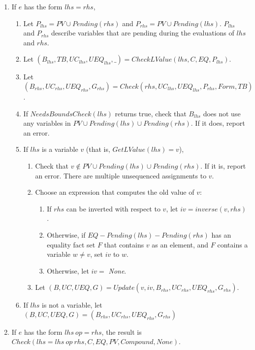 \begin{enumerate}
\item If $e$ has the form $lhs = rhs$,
\label{list:check-assignment}
\begin{enumerate}
\item Let $P_{lhs} = PV \cup Pending(rhs)$ and $P_{rhs} = PV \cup Pending(lhs).$   $P_{lhs}$
        and $P_{rhs}$ describe variables that are pending during the evaluations of $lhs$ and $rhs$.
\item Let $(B_{lhs}, TB, {UC}_{lhs}, {UEQ}_{lhs}, \_) = CheckLValue(lhs, C, EQ, P_{lhs})$.  
\item Let $(B_{rhs},  {UC}_{rhs}, {UEQ}_{rhs}, G_{rhs}) = 
Check(rhs, {UC}_{lhs}, {UEQ}_{lhs},P_{rhs}, Form, TB)$.
\item If $NeedsBoundsCheck(lhs)$ returns true, check that $B_{lhs}$ does not use any variables in 
$PV \cup Pending(lhs) \cup Pending(rhs)$.  If it does, report an error.
\item  If $lhs$ is a variable $v$ (that is, $GetLValue(lhs) = { v }$),
\begin{enumerate}
\item Check that $v \notin PV \cup Pending(lhs) \cup Pending(rhs)$.  If it is, report an error.  
There are multiple unsequenced assignments to $v$.
\item Choose an expression that computes the old value of $v$:
\begin{enumerate}
\item If $rhs$ can be inverted with respect to $v$, let $iv = inverse(v, rhs)$. 
\item Otherwise, if $EQ - Pending(lhs) - Pending(rhs)$ has an equality fact set  $F$ that contains $v$ as 
an element, and $F$ contains a variable $w \neq v$, set $iv$ to $w$.
\item Otherwise, let $iv = $ {\it None}.
\end{enumerate}
\item Let $(B, UC, UEQ, G) = Update(v, iv, B_{rhs}, UC_{rhs}, UEQ_{rhs}, G_{rhs})$.
\end{enumerate}
\item If $lhs$ is not a variable, let $(B, UC, UEQ, G) = (B_{rhs}, UC_{rhs}, UEQ_{rhs}, G_{rhs})$
\end{enumerate}


\item If $e$ has the form $lhs~op= rhs$, the result is 
$Check (lhs = lhs~op~rhs, C, EQ, PV, Compound, None)$.


\end{enumerate}
